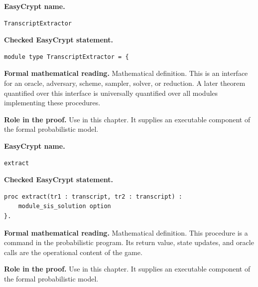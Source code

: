 \begin{formaldefinition}
\noindent\textbf{EasyCrypt name.}
\begin{lstlisting}[language=EasyCrypt,basicstyle=\ttfamily\scriptsize]
TranscriptExtractor
\end{lstlisting}
\noindent\textbf{Checked EasyCrypt statement.}
\begin{lstlisting}[language=EasyCrypt,basicstyle=\ttfamily\scriptsize]
module type TranscriptExtractor = {
\end{lstlisting}
\noindent\textbf{Formal mathematical reading.}
Mathematical definition. This is an interface for an oracle, adversary, scheme, sampler, solver, or reduction.  A later theorem quantified over this interface is universally quantified over all modules implementing these procedures.

\noindent\textbf{Role in the proof.}
Use in this chapter. It supplies an executable component of the formal probabilistic model.

\end{formaldefinition}

\begin{formaldefinition}
\noindent\textbf{EasyCrypt name.}
\begin{lstlisting}[language=EasyCrypt,basicstyle=\ttfamily\scriptsize]
extract
\end{lstlisting}
\noindent\textbf{Checked EasyCrypt statement.}
\begin{lstlisting}[language=EasyCrypt,basicstyle=\ttfamily\scriptsize]
proc extract(tr1 : transcript, tr2 : transcript) :
    module_sis_solution option
}.
\end{lstlisting}
\noindent\textbf{Formal mathematical reading.}
Mathematical definition. This procedure is a command in the probabilistic program.  Its return value, state updates, and oracle calls are the operational content of the game.

\noindent\textbf{Role in the proof.}
Use in this chapter. It supplies an executable component of the formal probabilistic model.

\end{formaldefinition}

